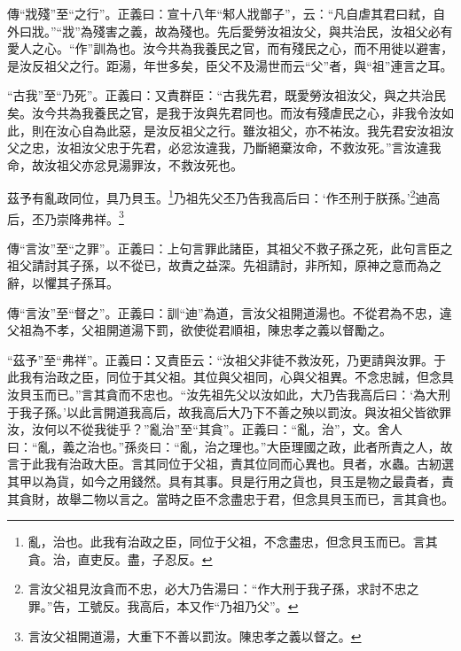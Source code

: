 {\noindent\zhuan{}\fzbyks 傳“戕殘”至“之行”。正義曰：宣十八年“邾人戕鄫子”，云：“凡自虐其君曰弒，自外曰戕。”“戕”為殘害之義，故為殘也。先后愛勞汝祖汝父，與共治民，汝祖父必有愛人之心。“作”訓為也。汝今共為我養民之官，而有殘民之心，而不用徙以避害，是汝反祖父之行。距湯，年世多矣，臣父不及湯世而云“父”者，與“祖”連言之耳。 \par}

{\noindent\shu{}\fzkt “古我”至“乃死”。正義曰：又責群臣：“古我先君，既愛勞汝祖汝父，與之共治民矣。汝今共為我養民之官，是我于汝與先君同也。而汝有殘虐民之心，非我令汝如此，則在汝心自為此惡，是汝反祖父之行。雖汝祖父，亦不祐汝。我先君安汝祖汝父之忠，汝祖汝父忠于先君，必忿汝違我，乃斷絕棄汝命，不救汝死。”言汝違我命，故汝祖父亦忿見湯罪汝，不救汝死也。 \par}

茲予有亂政同位，具乃貝玉。\footnote{亂，治也。此我有治政之臣，同位于父祖，不念盡忠，但念貝玉而已。言其貪。治，直吏反。盡，子忍反。}乃祖先父丕乃告我高后曰：‘作丕刑于朕孫。’\footnote{言汝父祖見汝貪而不忠，必大乃告湯曰：“作大刑于我子孫，求討不忠之罪。”告，工號反。我高后，本又作“乃祖乃父”。}迪高后，丕乃崇降弗祥。\footnote{言汝父祖開道湯，大重下不善以罰汝。陳忠孝之義以督之。}


{\noindent\zhuan{}\fzbyks 傳“言汝”至“之罪”。正義曰：上句言罪此諸臣，其祖父不救子孫之死，此句言臣之祖父請討其子孫，以不從已，故責之益深。先祖請討，非所知，原神之意而為之辭，以懼其子孫耳。 \par}

{\noindent\zhuan{}\fzbyks 傳“言汝”至“督之”。正義曰：訓“迪”為道，言汝父祖開道湯也。不從君為不忠，違父祖為不孝，父祖開道湯下罰，欲使從君順祖，陳忠孝之義以督勵之。 \par}

{\noindent\shu{}\fzkt “茲予”至“弗祥”。正義曰：又責臣云：“汝祖父非徒不救汝死，乃更請與汝罪。于此我有治政之臣，同位于其父祖。其位與父祖同，心與父祖異。不念忠誠，但念具汝貝玉而已。”言其貪而不忠也。“汝先祖先父以汝如此，大乃告我高后曰：‘為大刑于我子孫。’以此言開道我高后，故我高后大乃下不善之殃以罰汝。與汝祖父皆欲罪汝，汝何以不從我徙乎？”亂治”至“其貪”。正義曰：“亂，治”，文。舍人曰：“亂，義之治也。”孫炎曰：“亂，治之理也。”大臣理國之政，此者所責之人，故言于此我有治政大臣。言其同位于父祖，責其位同而心異也。貝者，水蟲。古紉選其甲以為貨，如今之用錢然。具有其事。貝是行用之貨也，貝玉是物之最貴者，責其貪財，故舉二物以言之。當時之臣不念盡忠于君，但念具貝玉而已，言其貪也。 \par}

